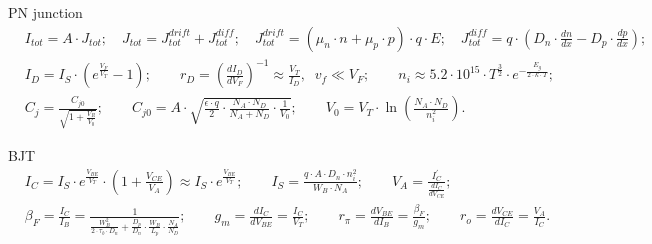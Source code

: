 \documentclass[11pt]{article}
\begin{document}
\thispagestyle{fancy}

\begin{sectionbox}{PN junction}
\begin{align*}
& I_{tot} = A \cdot J_{tot}; \quad 
     J_{tot} = J_{tot}^{drift} + J_{tot}^{diff}; \quad 
     J_{tot}^{drift} = (\mu_n \cdot n + \mu_p \cdot p) \cdot q \cdot E; \quad
     J_{tot}^{diff} = q \cdot \left( D_n \cdot \frac{d n}{d x} - D_p \cdot \frac{d p}{d x} \right); \\[0.5em]
& I_D = I_S \cdot (e^{\frac{V_F}{V_T}} - 1); \qquad
  r_D = \left( \frac{d I_D}{d V_F} \right)^{-1} \approx \frac{V_T}{I_D}, \;\; v_f \ll V_F; \qquad
  n_i \approx 5.2 \cdot 10^{15} \cdot T^{\frac{3}{2}} \cdot e^{-\frac{E_g}{2 \cdot k \cdot T}}; \\[0.5em]
& C_j = \frac{C_{j0}}{\sqrt{1 + \frac{V_R}{V_0}}}; \qquad
  C_{j0} = A \cdot \sqrt{\frac{\epsilon \cdot q}{2} \cdot \frac{N_A \cdot N_D}{N_A + N_D} \cdot \frac{1}{V_0}}; \qquad
  V_0 = V_T \cdot \ln \left( \frac{N_A \cdot N_D}{n_i^2} \right).
\end{align*}
\end{sectionbox}

\begin{sectionbox}{BJT}
\begin{align*}
& I_C = I_S \cdot e^{\frac{V_{BE}}{V_T}} \cdot (1 + \frac{V_{CE}}{V_A}) \approx I_S \cdot e^{\frac{V_{BE}}{V_T}}; \qquad
  I_S = \frac{q \cdot A \cdot D_n \cdot n_i^2}{W_B \cdot N_A}; \qquad
  V_A = \frac{I_C^{\prime}}{\frac{d I_C}{d V_{CE}}}; \\[0.5em]
& \beta_F = \frac{I_C}{I_B} = \frac{1}{\frac{W_B^2}{2 \cdot \tau_b \cdot D_n} + \frac{D_p}{D_n} \cdot \frac{W_B}{L_p} \cdot \frac{N_A}{N_D}}; \qquad
  g_m = \frac{d I_C}{d V_{BE}} = \frac{I_C}{V_T}; \qquad
  r_{\pi} = \frac{d V_{BE}}{d I_B} = \frac{\beta_F}{g_m}; \qquad %
  r_o = \frac{d V_{CE}}{d I_C} = \frac{V_A}{I_C}. 
\end{align*}
\end{sectionbox}
\end{document}
